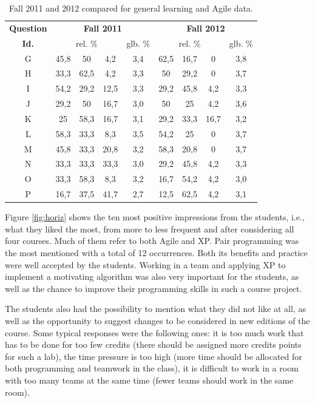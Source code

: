 \documentclass[conference]{IEEEtran}
\begin{document}
\begin{table}[!t]
  \renewcommand{\arraystretch}{1.3}
  \setlength{\tabcolsep}{0.6em}
  \caption{Fall 2011 and 2012 compared for general learning and Agile data.}
  \label{tab:t11vs12}
  \centering
  \begin{tabular}{|c||ccc|c|ccc|c|}
    \hline
    \bfseries Question & \multicolumn{4}{|c|}{\bfseries Fall 2011} & \multicolumn{4}{|c|}{\bfseries Fall 2012}\\
    \cline{2-5}
    \cline{6-9}
    \bfseries Id. & \multicolumn{3}{|c|}{rel. $\%$} & \multicolumn{1}{|c|}{glb. $\%$}  & \multicolumn{3}{|c|}{rel. $\%$} & \multicolumn{1}{|c|}{glb. $\%$}\\
    \hline\hline
    G & 45,8 & 50   & 4,2  & 3,4  & 62,5 & 16,7 & 0 &  3,8\\
    H & 33,3 & 62,5 & 4,2  & 3,3  & 50   & 29,2 & 0 &  3,7\\
    I & 54,2 & 29,2 & 12,5 & 3,3  & 29,2 & 45,8 & 4,2  & 3,3\\
    J & 29,2 & 50   & 16,7 & 3,0  & 50   & 25   & 4,2  & 3,6\\
    K & 25   & 58,3 & 16,7 & 3,1  & 29,2 & 33,3 & 16,7 & 3,2\\
    L & 58,3 & 33,3 & 8,3  & 3,5  & 54,2 & 25   & 0    & 3,7\\
    M & 45,8 & 33,3 & 20,8 & 3,2  & 58,3 & 20,8 & 0    & 3,7\\
    N & 33,3 & 33,3 & 33,3 & 3,0  & 29,2 & 45,8 & 4,2  & 3,3\\
    O & 33,3 & 58,3 & 8,3  & 3,2  & 16,7 & 54,2 & 4,2  & 3,0\\
    P & 16,7 & 37,5 & 41,7 & 2,7  & 12,5 & 62,5 & 4,2  & 3,1\\
    \hline
\end{tabular}
\end{table}

Figure \ref{fig:horiz} shows the ten most positive impressions from the students, i.e., what they liked the most, from more to less frequent and after considering all four courses. Much of them refer to both Agile and XP. Pair programming was the most mentioned with a total of 12 occurrences. Both its benefits and practice were well accepted by the students. Working in a team and applying XP to implement a motivating algorithm was also very important for the students, as well as the chance to improve their programming skills in such a course project.

The students also had the possibility to mention what they did not like at all, as well as the opportunity to suggest changes to be considered in new editions of the course. Some typical responses were the following ones: it is too much work that has to be done for too few credits (there should be assigned more credits points for such a lab), the time pressure is too high (more time should be allocated for both programming and teamwork in the class), it is difficult to work in a room with too many teams at the same time (fewer teams should work in the same room).
\end{document}
